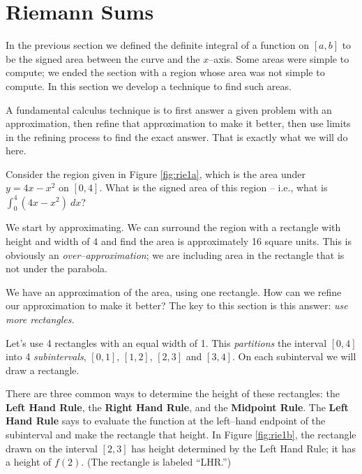 \section{Riemann Sums}\label{sec:riemann}

In the previous section we defined the definite integral of a function on $[a,b]$ to be the signed area between the curve and the $x$--axis. Some areas were simple to compute; we ended the section with a region whose area was not simple to compute. In this section we develop a technique to find such areas.

A fundamental calculus technique is to first answer a given problem with an approximation, then refine that approximation to make it better, then use limits in the refining process to find the exact answer. That is exactly what we will do here.

Consider the region given in Figure \ref{fig:rie1a}, which is the area under $y=4x-x^2$ on $[0,4]$. What is the signed area of this region -- i.e., what is $\int_0^4(4x-x^2)\ dx$?


We start by approximating. We can surround the region with a rectangle with height and width of 4 and find the area is approximately 16 square units. This is obviously an \textit{over--approximation}; we are including area in the rectangle that is not under the parabola. 


We have an approximation of the area, using one rectangle. How can we refine our approximation to make it better? The key to this section is this answer: \textit{use more rectangles.}

Let's use 4 rectangles with an equal width of 1. This \textit{partitions} the interval $[0,4]$ into 4 \textit{subintervals}, $[0,1]$, $[1,2]$, $[2,3]$ and $[3,4]$. On each subinterval we will draw a rectangle.

There are three common ways to determine the height of these rectangles: the \textbf{Left Hand Rule}, the \textbf{Right Hand Rule}, and the \textbf{Midpoint Rule}. The \textbf{Left Hand Rule} says to evaluate the function at the left--hand endpoint of the subinterval and make the rectangle that height. In Figure \ref{fig:rie1b}, the rectangle drawn on the interval $[2,3]$ has height determined by the Left Hand Rule; it has a height of $f(2)$. (The rectangle is labeled ``LHR.'')

